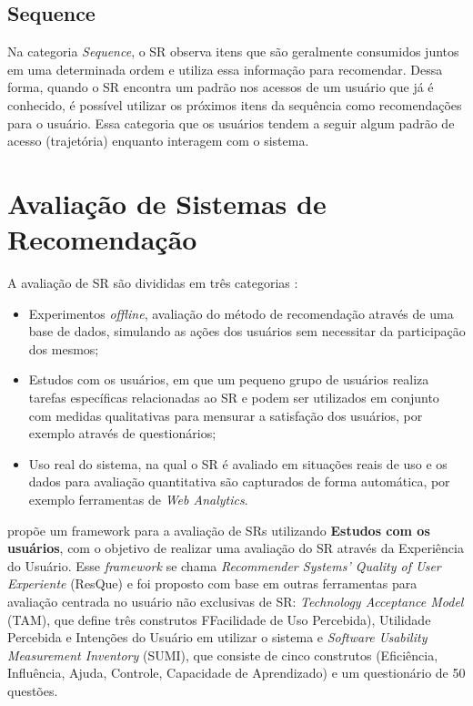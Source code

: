 \subsection{Sequence}

Na categoria \textit{Sequence}, o SR observa itens que são geralmente consumidos juntos em uma determinada ordem e utiliza essa
informação para recomendar. Dessa forma, quando o SR encontra um padrão nos acessos de um usuário que já é conhecido,
é possível utilizar os próximos itens da sequência como recomendações para o usuário. Essa categoria que os usuários
tendem a seguir algum padrão de acesso (trajetória) enquanto interagem com o sistema.

\section{Avaliação de Sistemas de Recomendação}

A avaliação de SR são divididas em três categorias \cite{shani2011evaluating}:

\begin{itemize}
\item Experimentos \textit{offline}, avaliação do método de recomendação através de uma base de dados, simulando as ações
dos usuários sem necessitar da participação dos mesmos;
\item Estudos com os usuários, em que um pequeno grupo de usuários realiza tarefas específicas relacionadas ao SR e
podem ser utilizados em conjunto com medidas qualitativas para mensurar a satisfação dos usuários, por exemplo através
de questionários;
\item Uso real do sistema, na qual o SR é avaliado em situações reais de uso e os dados para avaliação quantitativa são
capturados de forma automática, por exemplo ferramentas de \textit{Web Analytics}.
\end{itemize}

 propõe um framework para a avaliação de SRs utilizando \textbf{Estudos com os usuários}, com o objetivo
de realizar uma avaliação do SR através da Experiência do Usuário. Esse \textit{framework} se chama \textit{Recommender
Systems' Quality of User Experiente}  (ResQue) e foi proposto com base em outras ferramentas para avaliação centrada no
usuário não exclusivas de SR: \textit{Technology Acceptance Model} (TAM), que define três construtos FFacilidade de Uso
Percebida), Utilidade Percebida e Intenções do Usuário em utilizar o sistema e \textit{Software Usability Measurement
Inventory} (SUMI), que consiste de cinco construtos (Eficiência, Influência, Ajuda, Controle, Capacidade de Aprendizado)
e um questionário de 50 questões.

